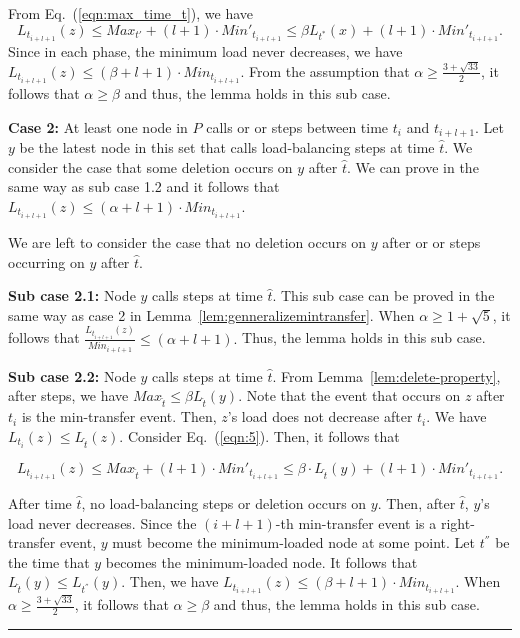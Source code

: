 \documentclass[a4paper]{article}
\newenvironment{proof}{{\bf Proof:}}{\hfill\rule{1.5mm}{3mm}\vspace{0.1in}}
\begin{document}
\begin{proof}
 From Eq.~(\ref{eqn:max_time_t}), we have 
 \[ L_{t_{i+l+1}}(z)\leq
 Max_{t'} + (l+1)\cdot Min'_{t_{i+l+1}} \leq \beta L_{t^*}(x) +
 (l+1)\cdot Min'_{t_{i+l+1}}. \] 
 Since in each phase, the minimum load never
 decreases, we have $ L_{t_{i+l+1}}(z) \leq (\beta+ l+1)\cdot
 Min_{t_{i+l+1}}$. From the assumption that $\alpha\geq\frac{3+\sqrt{33}}{2}$, it follows that
 $\alpha\geq\beta$ and thus, the lemma holds in this sub case.

 \textbf{Case 2:} At least one node in $P$ calls {\minbalance}
 or {\splitmax} or {\splitnbr} steps between time $t_i$ and
 $t_{i+l+1}$.  Let $y$ be the latest node in this set that calls 
 load-balancing steps at time $\hat{t}$.  We consider the case that
 some deletion occurs on $y$ after $\hat{t}$. We can prove in the same
 way as sub case 1.2 and it follows that $L_{t_{i+l+1}}(z)\leq(\alpha+
 l+1)\cdot Min_{t_{i+l+1}}$.
       
 We are left to consider the case that no deletion occurs on $y$ after
  {\minbalance} or {\splitnbr} or {\splitmax} steps occurring on $y$
 after $\hat{t}$.

 \textbf{Sub case 2.1:} Node $y$ calls {\minbalance} steps at time
 $\hat{t}$. This sub case can be proved in the same way as case 2 in
 Lemma~\ref{lem:genneralizemintransfer}. When $\alpha\geq 1+\sqrt{5}$,
 it follows that $ \frac{L_{t_{i+l+1}}(z)}{Min_{i+l+1}}\leq (\alpha+l+1).$
 Thus, the lemma holds in this sub case.

 \textbf{Sub case 2.2:} Node $y$ calls {\splitnbr} steps at time
 $\hat{t}$. From Lemma~\ref{lem:delete-property}, after {\splitnbr}
 steps, we have $Max_{\hat{t}}\leq \beta L_{\hat{t}}(y)$.  Note that
 the event that occurs on $z$ after $t_i$ is the min-transfer
 event. Then, $z$'s load does not decrease after $t_i$. We have
 $L_{t_i}(z)\leq L_{\hat{t}}(z)$. Consider Eq.~(\ref{eqn:5}). Then, it follows that

 \[L_{t_{i+l+1}}(z) \leq Max_{\hat{t}}+ (l+1)\cdot Min'_{t_{i+l+1}}
 \leq \beta\cdot L_{\hat{t}}(y)+ (l+1)\cdot Min'_{t_{i+l+1}}.\] 

  After time $\hat{t}$, no load-balancing steps or deletion occurs on $y$.  Then,
 after $\hat{t}$, $y$'s load never decreases.  Since the $(i+l+1)$-th 
 min-transfer event is a right-transfer event, $y$ must become the 
 minimum-loaded node at some point.  Let $t^{''}$ be
 the time that $y$ becomes the minimum-loaded node. 
 It follows that
 $L_{\hat{t}}(y)\leq L_{t^{''}}(y)$.  Then, we have
 $L_{t_{i+l+1}}(z)\leq(\beta+ l+1)\cdot Min_{t_{i+l+1}}$. When
 $\alpha\geq\frac{3+\sqrt{33}}{2}$, it follows that $\alpha\geq\beta$ and
 thus, the lemma holds in this sub case.


\end{proof}
\end{document}
